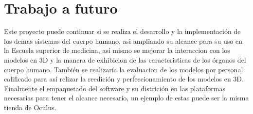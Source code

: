 \section{Trabajo a futuro}
Este proyecto puede continuar si se realiza el desarrollo y la implementaci\'on de los demas sistemas del cuerpo humano, asi ampliando su alcance para su uso en la Escuela superior de medicina,
as\'i mismo se mejorar la interaccion con los modelos en 3D y la manera de exhibicion de las caracteristicas de los \'organos del cuerpo humano.
Tambi\'en se realizar\'ia la evaluacion de los modelos por personal calificado para as\'i relizar la reedici\'on y perfeccionamiento de los modelos en 3D.
Finalmente el empaquetado del software y su districi\'on en las plataformas necesarias para tener el alcance necesario, un ejemplo de estas puede ser la misma tienda de 
Oculus.

